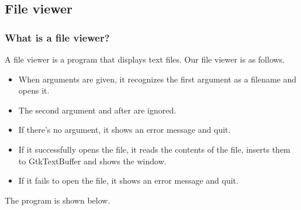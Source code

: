 \subsection{File viewer}\label{file-viewer}

\subsubsection{What is a file viewer?}\label{what-is-a-file-viewer}

A file viewer is a program that displays text files. Our file viewer is
as follows.

\begin{itemize}
\tightlist
\item
  When arguments are given, it recognizes the first argument as a
  filename and opens it.
\item
  The second argument and after are ignored.
\item
  If there's no argument, it shows an error message and quit.
\item
  If it successfully opens the file, it reads the contents of the file,
  inserts them to GtkTextBuffer and shows the window.
\item
  If it fails to open the file, it shows an error message and quit.
\end{itemize}

The program is shown below.

